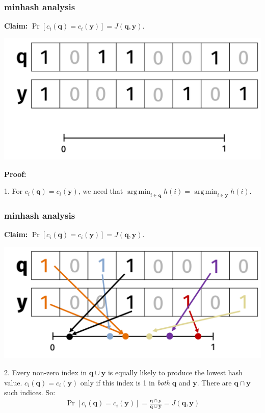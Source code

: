 \documentclass[compress]{beamer}
\newcommand{\bv}[1]{\mathbf{#1}}
\DeclareMathOperator*{\argmin}{arg\,min}
\begin{document}
\begin{frame}[t]
	\frametitle{minhash analysis}
	\textbf{Claim:} $\Pr[c_i(\bv{q}) = c_i(\bv{y})] = J(\bv{q},\bv{y})$.	
	\begin{center}
		\includegraphics[width=.8\textwidth]{minHashSimple.png}
	\end{center}
	\textbf{Proof:} 
	
	1. For $c_i(\bv{q}) = c_i(\bv{y})$, we need that $\argmin_{i\in \bv{q}} h(i) = \argmin_{i\in \bv{y}} h(i)$.
\end{frame}

\begin{frame}[t]
	\frametitle{minhash analysis}
	\textbf{Claim:} $\Pr[c_i(\bv{q}) = c_i(\bv{y})] = J(\bv{q},\bv{y})$.	
	\begin{center}
		\includegraphics[width=.8\textwidth]{minhash_colored.png}
	\end{center}
	2. Every non-zero index in $\bv{q}\cup \bv{y}$ is equally likely to produce the lowest hash value.
	$c_i(\bv{q}) = c_i(\bv{y})$ only if this index is 1 in \emph{both} $\bv{q}$ and $\bv{y}$. There are $\bv{q}\cap \bv{y}$ such indices. So:
	\begin{align*}
		\Pr[c_i(\bv{q}) =c_i(\bv{y})]= \frac{\bv{q}\cap \bv{y}}{\bv{q}\cup \bv{y}}  = J(\bv{q},\bv{y})
	\end{align*}
\end{frame}
\end{document}

